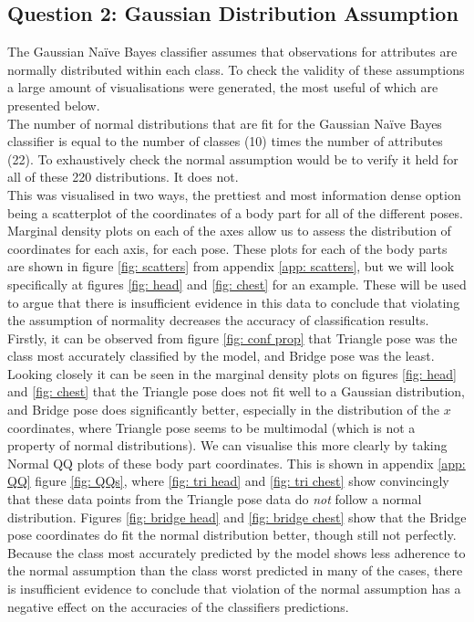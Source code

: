 \documentclass{article}
\begin{document}
\subsection*{Question 2: Gaussian Distribution Assumption}
The Gaussian Naïve Bayes classifier assumes that observations for attributes are normally distributed within each class. To check the validity of these assumptions a large amount of visualisations were generated, the most useful of which are presented below.\\[2mm]
The number of normal distributions that are fit for the Gaussian Naïve Bayes classifier is equal to the number of classes (10) times the number of attributes (22). To exhaustively check the normal assumption would be to verify it held for all of these 220 distributions. It does not.\\[2mm]
This was visualised in two ways, the prettiest and most information dense option being a scatterplot of the coordinates of a body part for all of the different poses. Marginal density plots on each of the axes allow us to assess the distribution of coordinates for each axis, for each pose. These plots for each of the body parts are shown in figure \ref{fig: scatters} from appendix \ref{app: scatters}, but we will look specifically at figures \ref{fig: head} and \ref{fig: chest} for an example. These will be used to argue that there is insufficient evidence in this data to conclude that violating the assumption of normality decreases the accuracy of classification results.\\[2mm]
Firstly, it can be observed from figure \ref{fig: conf prop} that Triangle pose was the class most accurately classified by the model, and Bridge pose was the least. Looking closely it can be seen in the marginal density plots on figures \ref{fig: head} and \ref{fig: chest} that the Triangle pose does not fit well to a Gaussian distribution, and Bridge pose does significantly better, especially in the distribution of the $x$ coordinates, where Triangle pose seems to be multimodal (which is not a property of normal distributions). We can visualise this more clearly by taking Normal QQ plots of these body part coordinates. This is shown in appendix \ref{app: QQ} figure \ref{fig: QQs}, where \ref{fig: tri head} and \ref{fig: tri chest} show convincingly that these data points from the Triangle pose data do \textit{not} follow a normal distribution. Figures \ref{fig: bridge head} and \ref{fig: bridge chest} show that the Bridge pose coordinates do fit the normal distribution better, though still not perfectly.\\[2mm]
Because the class most accurately predicted by the model shows less adherence to the normal assumption than the class worst predicted in many of the cases, there is insufficient evidence to conclude that violation of the normal assumption has a negative effect on the accuracies of the classifiers predictions.
\end{document}
